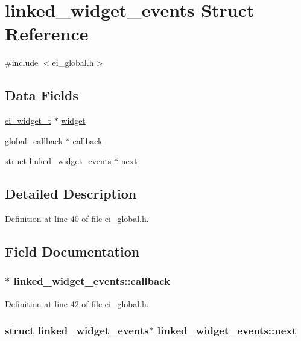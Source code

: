 \hypertarget{structlinked__widget__events}{
\section{linked\_\-widget\_\-events Struct Reference}
\label{structlinked__widget__events}
}


{\ttfamily \#include $<$ei\_\-global.h$>$}\subsection*{Data Fields}
\begin{DoxyCompactItemize}
\item 
\hyperlink{structei__widget__t}{ei\_\-widget\_\-t} $\ast$ \hyperlink{structlinked__widget__events_a4ed4583052de8776f7314ad141d24bc4}{widget}
\item 
\hyperlink{structglobal__callback}{global\_\-callback} $\ast$ \hyperlink{structlinked__widget__events_a65ff8fb376250fd6b91bee6f7bebdde9}{callback}
\item 
struct \hyperlink{structlinked__widget__events}{linked\_\-widget\_\-events} $\ast$ \hyperlink{structlinked__widget__events_a40e564a39103e1445796cf55f21b9584}{next}
\end{DoxyCompactItemize}


\subsection{Detailed Description}


Definition at line 40 of file ei\_\-global.h.

\subsection{Field Documentation}
\hypertarget{structlinked__widget__events_a65ff8fb376250fd6b91bee6f7bebdde9}{
\subsubsection[{callback}]{$\ast$ {\bf linked\_\-widget\_\-events::callback}}}
\label{structlinked__widget__events_a65ff8fb376250fd6b91bee6f7bebdde9}


Definition at line 42 of file ei\_\-global.h.\hypertarget{structlinked__widget__events_a40e564a39103e1445796cf55f21b9584}{
\subsubsection[{next}]{\setlength{\rightskip}{0pt plus 5cm}struct {\bf linked\_\-widget\_\-events}$\ast$ {\bf linked\_\-widget\_\-events::next}}}
\label{structlinked__widget__events_a40e564a39103e1445796cf55f21b9584}


